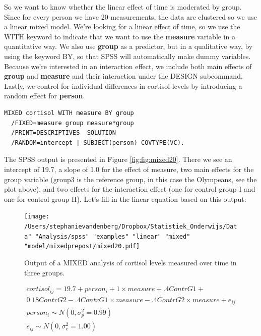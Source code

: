 \documentclass[]{book}\usepackage[]{graphicx}\usepackage[]{color}
\begin{document}
So we want to know whether the linear effect of time is moderated by group. Since for every person we have 20 measurements, the data are clustered so we use a linear mixed model. We're looking for a linear effect of time, so we use the WITH keyword to indicate that we want to use the \textbf{measure} variable in a quantitative way. We also use \textbf{group} as a predictor, but in a qualitative way, by using the keyword BY, so that SPSS will automatically make dummy variables. Because we're interested in an interaction effect, we include both main effects of \textbf{group} and \textbf{measure} and their interaction under the DESIGN subcommand. Lastly, we control for individual differences in cortisol levels by introducing a random effect for \textbf{person}.


\begin{verbatim}
MIXED cortisol WITH measure BY group 
  /FIXED=measure group measure*group
  /PRINT=DESCRIPTIVES  SOLUTION
  /RANDOM=intercept | SUBJECT(person) COVTYPE(VC).
\end{verbatim}


The SPSS output is presented in Figure \ref{fig:fig:mixed20}. There we see an intercept of 19.7, a slope of 1.0 for the effect of measure, two main effects for the group variable (group3 is the reference group, in this case the Olympeans, see the plot above), and two effects for the interaction effect (one for control group I and one for control group II). Let's fill in the linear equation based on this output:



\begin{figure}[h]
    \begin{center}
       \texttt{[image: /Users/stephanievandenberg/Dropbox/Statistiek\_Onderwijs/Data" "Analysis/spss" "examples" "linear" "mixed" "model/mixedprepost/mixed20.pdf]}
    \end{center}
    \label{fig:mixed20}
    \caption{Output of a MIXED analysis of cortisol levels measured over time in three groups.}
\end{figure}



\begin{eqnarray}
cortisol_{ij} = 19.7 + person_i + 1 \times measure + .4  ContrG1 + \nonumber\\
      0.18 ContrG2 -.4  ContrG1 \times measure -.4  ContrG2 \times measure+   e_{ij} \nonumber\\
person_i \sim N(0, \sigma_p^2 = 0.99)\nonumber\\
e_{ij} \sim N(0, \sigma_e^2 = 1.00) \nonumber
\end{eqnarray}
\end{document}
